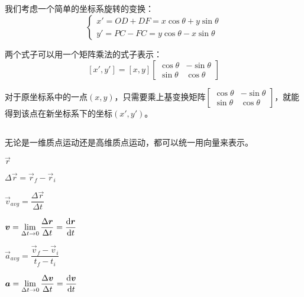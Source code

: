 \subsection[基变换]{}
我们考虑一个简单的坐标系旋转的变换：
\[\begin{cases}
        x'=OD+DF=x\cos\theta+y\sin\theta \\
        y'=PC-FC=y\cos\theta-x\sin\theta
    \end{cases}\]

两个式子可以用一个矩阵乘法的式子表示：
\[\left [ x',y' \right ] =\left [ x,y \right ]\begin{bmatrix}
        \cos\theta & -\sin\theta \\
        \sin\theta & \cos\theta
    \end{bmatrix}\]

对于原坐标系中的一点$(x,y)$，只需要乘上基变换矩阵$\begin{bmatrix}
        \cos\theta & -\sin\theta \\
        \sin\theta & \cos\theta
    \end{bmatrix}$，就能得到该点在新坐标系下的坐标$(x',y')$。

\subsection[质点运动的向量表示法]{}
无论是一维质点运动还是高维质点运动，都可以统一用向量来表示。
\begin{Itemize}
    \item {} $\vec{r}$
    \item {} $\Delta\vec{r}=\vec{r}_{f}-\vec{r}_{i}$
    \item {} $\vec{v}_{avg}=\dfrac{\Delta \vec{r}}{\Delta t}$
    \item {} $\displaystyle\vec{v}=\lim_{\Delta t \to 0} \frac{\Delta \vec{r}}{\Delta t}=\frac{\dif \vec{r}}{\dif  t}$
    \item {} $\vec{a}_{avg}=\dfrac{\vec{v}_{f}-\vec{v}_{i}}{t_{f}-t_{i}}$
    \item {} $\displaystyle\vec{a}=\lim_{\Delta t \to 0}\frac{\Delta \vec{v}}{\Delta t}=\frac{\dif \vec{v}}{\dif  t}$
\end{Itemize}

